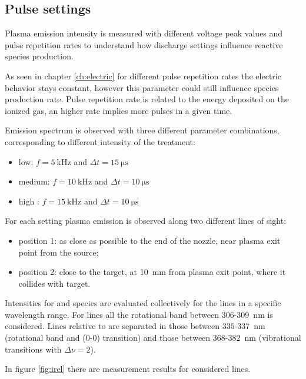 \subsection{Pulse settings}
Plasma emission intensity is measured with different voltage peak values and pulse repetition rates to understand how discharge settings influence reactive species production.

As seen in chapter \ref{ch:electric} for different pulse repetition rates the electric behavior stays constant, however this parameter could still influence species production rate. Pulse repetition rate is related to the energy deposited on the ionized gas, an higher rate implies more pulses in a given time.

Emission spectrum is observed with three different parameter combinations, corresponding to different intensity of the treatment:
\begin{itemize}
 \item low: $f = \SI{5}{\kilo\hertz}$ and $\Delta t = \SI{15}{\micro\second}$
 \item medium: $f = \SI{10}{\kilo\hertz}$ and $\Delta t = \SI{10}{\micro\second}$
 \item high : $f = \SI{15}{\kilo\hertz}$ and $\Delta t = \SI{10}{\micro\second}$
\end{itemize}

For each setting plasma emission is observed along two different lines of sight:
\begin{itemize}
 \item position 1: as close as possible to the end of the nozzle, near plasma exit point from the source;
 \item position 2: close to the target, at \SI{10}{\milli\meter} from plasma exit point, where it collides with target.
\end{itemize}

Intensities for  and  species are evaluated collectively for the lines in a specific wavelength range. For  lines all the rotational band between $\num{306}$-\SI{309}{\nano\meter} is considered. Lines relative to  are separated in those between $\num{335}$-\SI{337}{\nano\meter} (rotational band and (0-0) transition) and those between $\num{368}$-\SI{382}{\nano\meter} (vibrational transitions with $\Delta \nu = 2$).

In figure \ref{fig:irel} there are measurement results for considered lines.

